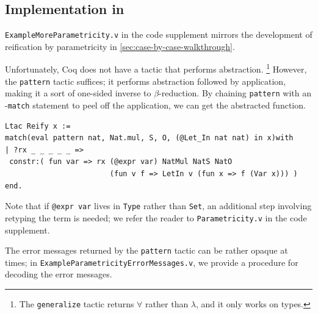 \subsection{Implementation in \Ltac}

\texttt{ExampleMoreParametricity.v} in the code supplement mirrors the development of reification by parametricity in \autoref{sec:case-by-case-walkthrough}.

Unfortunately, Coq does not have a tactic that performs abstraction.%
\footnote{%
    The \texttt{generalize} tactic returns $\forall$ rather than $\lambda$, and it only works on types.%
}
However, the \texttt{pattern} tactic suffices; it performs abstraction followed by application, making it a sort of one-sided inverse to $\beta$-reduction.
By chaining \texttt{pattern} with an \Ltac-\texttt{match} statement to peel off the application, we can get the abstracted function.
\begin{verbatim}
Ltac Reify x :=
match(eval pattern nat, Nat.mul, S, O, (@Let_In nat nat) in x)with
| ?rx _ _ _ _ _ =>
 constr:( fun var => rx (@expr var) NatMul NatS NatO
                        (fun v f => LetIn v (fun x => f (Var x))) )
end.
\end{verbatim}
Note that if \texttt{@expr var} lives in \texttt{Type} rather than \texttt{Set}, an additional step involving retyping the term is needed; we refer the reader to \texttt{Parametricity.v} in the code supplement.

The error messages returned by the \texttt{pattern} tactic can be rather opaque at times; in \texttt{ExampleParametricityErrorMessages.v}, we provide a procedure for decoding the error messages.

